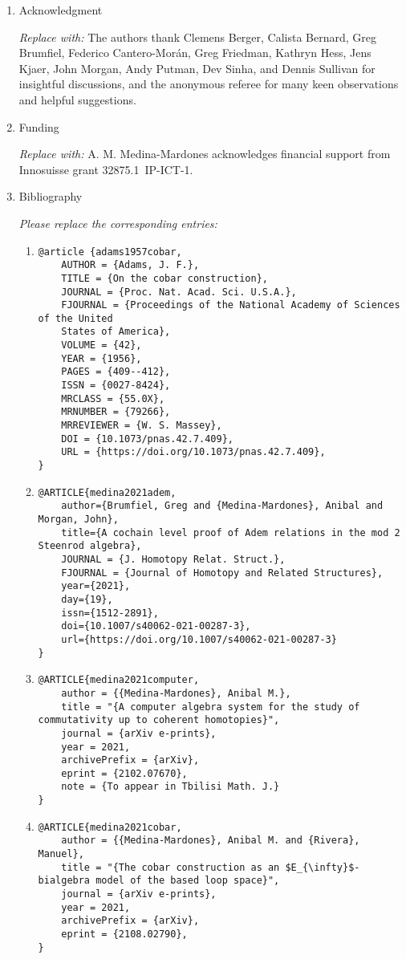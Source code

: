 \documentclass{amsart}
\theoremstyle{definition}
\begin{document}
\begin{enumerate}
\item Acknowledgment \par
\textit{Replace with:}
The authors thank Clemens Berger, Calista Bernard, Greg Brumfiel, Federico Cantero-Mor\'an, Greg Friedman, Kathryn Hess, Jens Kjaer, John Morgan, Andy Putman, Dev Sinha, and Dennis Sullivan for insightful discussions, and the anonymous referee for many keen observations and helpful suggestions.

\item Funding \par
\textit{Replace with:}
A. M. Medina-Mardones acknowledges financial support from Innosuisse grant \mbox{32875.1 IP-ICT-1}.

\item Bibliography \par
\textit{Please replace the corresponding entries:}
\begin{enumerate}
\item
\begin{Verbatim}
@article {adams1957cobar,
	AUTHOR = {Adams, J. F.},
	TITLE = {On the cobar construction},
	JOURNAL = {Proc. Nat. Acad. Sci. U.S.A.},
	FJOURNAL = {Proceedings of the National Academy of Sciences of the United
	States of America},
	VOLUME = {42},
	YEAR = {1956},
	PAGES = {409--412},
	ISSN = {0027-8424},
	MRCLASS = {55.0X},
	MRNUMBER = {79266},
	MRREVIEWER = {W. S. Massey},
	DOI = {10.1073/pnas.42.7.409},
	URL = {https://doi.org/10.1073/pnas.42.7.409},
}
\end{Verbatim}
\item
\begin{Verbatim}
@ARTICLE{medina2021adem,
	author={Brumfiel, Greg and {Medina-Mardones}, Anibal and Morgan, John},
	title={A cochain level proof of Adem relations in the mod 2 Steenrod algebra},
	JOURNAL = {J. Homotopy Relat. Struct.},
	FJOURNAL = {Journal of Homotopy and Related Structures},
	year={2021},
	day={19},
	issn={1512-2891},
	doi={10.1007/s40062-021-00287-3},
	url={https://doi.org/10.1007/s40062-021-00287-3}
}
\end{Verbatim}
\item
\begin{Verbatim}
@ARTICLE{medina2021computer,
	author = {{Medina-Mardones}, Anibal M.},
	title = "{A computer algebra system for the study of commutativity up to coherent homotopies}",
	journal = {arXiv e-prints},
	year = 2021,
	archivePrefix = {arXiv},
	eprint = {2102.07670},
	note = {To appear in Tbilisi Math. J.}
}
\end{Verbatim}

\item
\begin{Verbatim}
@ARTICLE{medina2021cobar,
	author = {{Medina-Mardones}, Anibal M. and {Rivera}, Manuel},
	title = "{The cobar construction as an $E_{\infty}$-bialgebra model of the based loop space}",
	journal = {arXiv e-prints},
	year = 2021,
	archivePrefix = {arXiv},
	eprint = {2108.02790},
}
\end{Verbatim}
\end{enumerate}
\end{enumerate}
\end{document}
